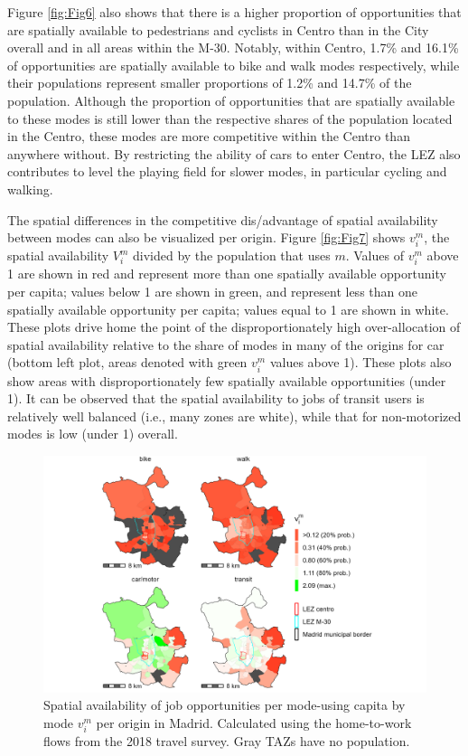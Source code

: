 \documentclass[10pt,letterpaper]{article}
\begin{document}
Figure \ref{fig:Fig6} also shows that there is a higher proportion of
opportunities that are spatially available to pedestrians and cyclists
in Centro than in the City overall and in all areas within the M-30.
Notably, within Centro, 1.7\% and 16.1\% of opportunities are spatially
available to bike and walk modes respectively, while their populations
represent smaller proportions of 1.2\% and 14.7\% of the population.
Although the proportion of opportunities that are spatially available to
these modes is still lower than the respective shares of the population
located in the Centro, these modes are more competitive within the
Centro than anywhere without. By restricting the ability of cars to
enter Centro, the LEZ also contributes to level the playing field for
slower modes, in particular cycling and walking.

The spatial differences in the competitive dis/advantage of spatial
availability between modes can also be visualized per origin. Figure
\ref{fig:Fig7} shows \(v_i^m\), the spatial availability \(V_i^m\)
divided by the population that uses \(m\). Values of \(v_i^m\) above 1
are shown in red and represent more than one spatially available
opportunity per capita; values below 1 are shown in green, and represent
less than one spatially available opportunity per capita; values equal
to 1 are shown in white. These plots drive home the point of the
disproportionately high over-allocation of spatial availability relative
to the share of modes in many of the origins for car (bottom left plot,
areas denoted with green \(v_i^m\) values above 1). These plots also
show areas with disproportionately few spatially available opportunities
(under 1). It can be observed that the spatial availability to jobs of
transit users is relatively well balanced (i.e., many zones are white),
while that for non-motorized modes is low (under 1) overall.

\begin{figure}

{\centering \includegraphics[width=1\linewidth]{images/SA_im_vv_zn208_plot} 

}

\caption{\label{fig:Fig7} Spatial availability of job opportunities per mode-using capita by mode $v_i^m$ per origin in Madrid. Calculated using the home-to-work flows from the 2018 travel survey. Gray TAZs have no population.}\label{fig:SA-per-capita-m-plot}
\end{figure}
\end{document}
